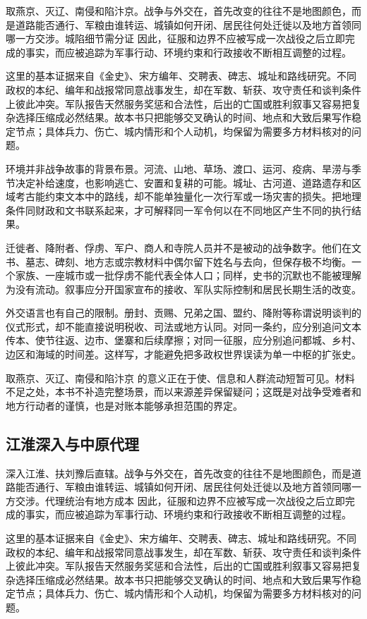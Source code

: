 取燕京、灭辽、南侵和陷汴京。战争与外交在，首先改变的往往不是地图颜色，而是道路能否通行、军粮由谁转运、城镇如何开闭、居民往何处迁徙以及地方首领同哪一方交涉。城陷细节需分证 因此，征服和边界不应被写成一次战役之后立即完成的事实，而应被追踪为军事行动、环境约束和行政接收不断相互调整的过程。

这里的基本证据来自《金史》、宋方编年、交聘表、碑志、城址和路线研究。不同政权的本纪、编年和战报常同意战事发生，却在军数、斩获、攻守责任和谈判条件上彼此冲突。军队报告天然服务奖惩和合法性，后出的亡国或胜利叙事又容易把复杂选择压缩成必然结果。故本书只把能够交叉确认的时间、地点和大致后果写作稳定节点；具体兵力、伤亡、城内情形和个人动机，均保留为需要多方材料核对的问题。

环境并非战争故事的背景布景。河流、山地、草场、渡口、运河、疫病、旱涝与季节决定补给速度，也影响逃亡、安置和复耕的可能。城址、古河道、道路遗存和区域考古能约束文本中的路线，却不能单独量化一次行军或一场灾害的损失。把地理条件同财政和文书联系起来，才可解释同一军令何以在不同地区产生不同的执行结果。

迁徙者、降附者、俘虏、军户、商人和寺院人员并不是被动的战争数字。他们在文书、墓志、碑刻、地方志或宗教材料中偶尔留下姓名与去向，但保存极不均衡。一个家族、一座城市或一批俘虏不能代表全体人口；同样，史书的沉默也不能被理解为没有流动。叙事应分开国家宣布的接收、军队实际控制和居民长期生活的改变。

外交语言也有自己的限制。册封、贡赐、兄弟之国、盟约、降附等称谓说明谈判的仪式形式，却不能直接说明税收、司法或地方认同。对同一条约，应分别追问文本传本、使节往返、边市、堡寨和后续摩擦；对同一征服，应分别追问都城、乡村、边区和海域的时间差。这样写，才能避免把多政权世界误读为单一中枢的扩张史。

取燕京、灭辽、南侵和陷汴京 的意义正在于使、信息和人群流动短暂可见。材料不足之处，本书不补造完整场景，而以来源差异保留疑问；这既是对战争受难者和地方行动者的谨慎，也是对账本能够承担范围的界定。

\subsection{江淮深入与中原代理}

深入江淮、扶刘豫后直辖。战争与外交在，首先改变的往往不是地图颜色，而是道路能否通行、军粮由谁转运、城镇如何开闭、居民往何处迁徙以及地方首领同哪一方交涉。代理统治有地方成本 因此，征服和边界不应被写成一次战役之后立即完成的事实，而应被追踪为军事行动、环境约束和行政接收不断相互调整的过程。

这里的基本证据来自《金史》、宋方编年、交聘表、碑志、城址和路线研究。不同政权的本纪、编年和战报常同意战事发生，却在军数、斩获、攻守责任和谈判条件上彼此冲突。军队报告天然服务奖惩和合法性，后出的亡国或胜利叙事又容易把复杂选择压缩成必然结果。故本书只把能够交叉确认的时间、地点和大致后果写作稳定节点；具体兵力、伤亡、城内情形和个人动机，均保留为需要多方材料核对的问题。

